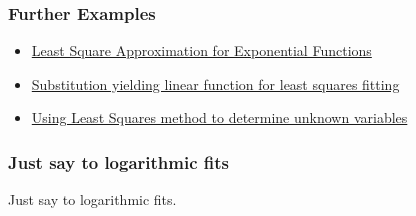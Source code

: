 %
\begin{frame}\frametitle{Further Examples}
\begin{itemize}
	\item \href{https://math.stackexchange.com/questions/1488747/least-square-approximation-for-exponential-functions/2163333\#2163333}{Least Square Approximation for Exponential Functions}
	\item \href{https://math.stackexchange.com/questions/1934347/substitution-yielding-linear-function-for-least-squares-fitting/2170544\#2170544}{Substitution yielding linear function for least squares fitting}
	\item \href{https://math.stackexchange.com/questions/699071/using-least-squares-method-to-determine-unknown-variables/2204288\#2204288}{Using Least Squares method to determine unknown variables}
\end{itemize}
\end{frame}
%

%
\begin{frame}\frametitle{Just say  to logarithmic fits\jumpBig}
\center
\huge{
Just say  to logarithmic fits.
}
\end{frame}

